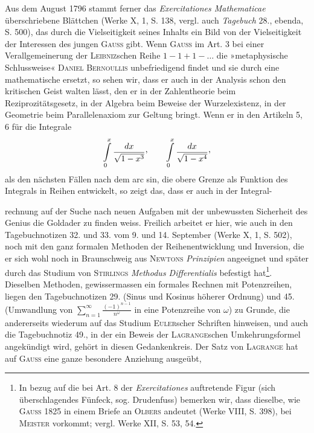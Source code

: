 Aus dem August 1796 stammt ferner das \textit{Exercitationes Mathematicae} überschriebene
Blättchen (Werke X, 1, S. 138, vergl. auch \textit{Tagebuch} 28., ebenda,
S. 500), das durch die Vielseitigkeit seines Inhalts ein Bild von der Vielseitigkeit
der Interessen des jungen \textsc{Gauss} gibt. Wenn \textsc{Gauss} im Art. 3 bei einer
Verallgemeinerung der \textsc{Leibniz}schen Reihe \(1-1+1-\ldots\) die »metaphysische
Schlussweise« \textsc{Daniel Bernoullis} unbefriedigend findet und sie durch eine mathematische
ersetzt, so sehen wir, dass er auch in der Analysis schon den kritischen
Geist walten lässt, den er in der Zahlentheorie beim Reziprozitätsgesetz, in
der Algebra beim Beweise der Wurzelexistenz, in der Geometrie beim Parallelenaxiom
zur Geltung bringt. Wenn er in den Artikeln 5, 6 für die Integrale
\[
\int\limits_0^x\frac{dx}{\sqrt{1-x^3}}\mathpunct{\vcenter{\hbox{,}}}
\qquad
\int\limits_0^x\frac{dx}{\sqrt{1-x^4}}\mathpunct{\vcenter{\hbox{,}}}
\]
als den nächsten Fällen nach dem arc sin, die obere Grenze als Funktion
des Integrals in Reihen entwickelt, so zeigt das, dass er auch in der Integral-\par
\clearpage{}
\noindent rechnung auf der Suche nach neuen Aufgaben mit der unbewussten Sicherheit
des Genius die Goldader zu finden weiss. Freilich arbeitet er hier, wie auch
in den Tagebuchnotizen 32. und 33. vom 9. und 14. September (Werke X, 1,
S. 502), noch mit den ganz formalen Methoden der Reihenentwicklung und
Inversion, die er sich wohl noch in Braunschweig aus \textsc{Newtons} \textit{Prinzipien}
angeeignet und später durch das Studium von \textsc{Stirlings} \textit{Methodus Differentialis}
befestigt hat\footnote{In bezug auf die bei Art. 8 der \textit{Exercitationes} auftretende Figur (sich überschlagendes Fünfeck, sog. Drudenfuss) bemerken wir, dass dieselbe, wie \textsc{Gauss} 1825 in einem Briefe an \textsc{Olbers} andeutet (Werke VIII, S. 398), bei \textsc{Meister} vorkommt; vergl. Werke XII, S. 53, 54.}.
Dieselben Methoden, gewissermassen ein formales Rechnen
mit Potenzreihen, liegen den Tagebuchnotizen 29. (Sinus und Kosinus höherer
Ordnung) und 45. (Umwandlung von \(\displaystyle\sum_{n=1}^{\infty}\frac{(-1)^{n-1}}{n^\omega}\) in eine Potenzreihe von \(\omega\)) zu
Grunde, die andererseits wiederum auf das Studium \textsc{Euler}scher Schriften hinweisen,
und auch die Tagebuchnotiz 49., in der ein Beweis der \textsc{Lagrange}schen
Umkehrungsformel angekündigt wird, gehört in diesen Gedankenkreis.
Der Satz von \textsc{Lagrange} hat auf \textsc{Gauss} eine ganze besondere Anziehung ausgeübt,

